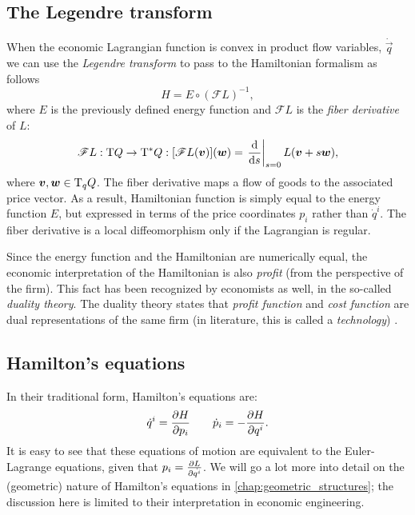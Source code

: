 \subsection{The Legendre transform} 
When the economic Lagrangian function is convex in product flow variables, \(\dot{\vec{q}}\) we can use the \emph{Legendre transform} to pass to the Hamiltonian formalism as follows \cite{Abraham1978}
\begin{equation}
    H = E \circ (\mathscr{F}L)^{-1},
\end{equation}
where \(E\) is the previously defined energy function and \(\mathscr{F}L\) is the \emph{fiber derivative} of \(L\): \cite{Marsden1998}
\begin{equation}
    \mathscr{F}L: \tbundle{Q} \to \ctbundle{Q}: [\mathscr{F}L(\vec{v})](\vec{w}) = \left .\dv{}{s}\right|_{s = 0} L(\vec{v} + s\vec{w}),
\end{equation}
where \(\vec{v}, \vec{w} \in \tspace{q}{Q}\). The fiber derivative maps a flow of goods to the associated price vector. As a result, Hamiltonian function is simply equal to the energy function \(E\), but expressed in terms of the price coordinates \(p_i\) rather than \(\dot{q}^i\). The fiber derivative is a local diffeomorphism only if the Lagrangian is regular.

Since the energy function and the Hamiltonian are numerically equal, the economic interpretation of the Hamiltonian is also \emph{profit} (from the perspective of the firm). This fact has been recognized by economists as well, in the so-called \emph{duality theory}. The duality theory states that \emph{profit function} and \emph{cost function} are dual representations of the same firm (in literature, this is called a \emph{technology}) \cite{blume2020,varianhalr1992}.

\subsection{Hamilton's equations} 
In their traditional form, Hamilton's equations are:
\begin{equation}
    \dot{q}^i = \pdv{H}{p_i} \qquad \dot{p}_i = -\pdv{H}{q^i}.
\end{equation}
It is easy to see that these equations of motion are equivalent to the Euler-Lagrange equations, given that \(p_i = \pdv{L}{\dot{q^i}}\). We will go a lot more into detail on the (geometric) nature of Hamilton's equations in \cref{chap:geometric_structures}; the discussion here is limited to their interpretation in economic engineering.

